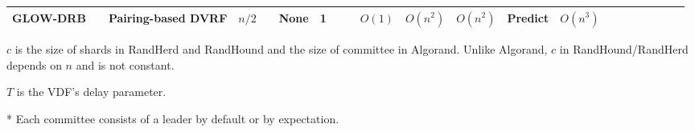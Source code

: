 \documentclass[letterpaper,twocolumn,10pt]{article}
\newcommand{\cmark}{\ding{51}}
\newcommand{\xmark}{\ding{55}}
\theoremstyle{definition}
\theoremstyle{remark}
\begin{document}
\begin{table*}[pt]
\begin{threeparttable}
\begin{tabularx}{\textwidth}{@{} l *{20}c}
GLOW-DRB & & Pairing-based DVRF & $n/2$ & \xmark & None & 1 & \cmark & \cmark & $O(1)$ & $O(n^2)$ & $O(n^2)$ & Predict & $O(n^3)$ \\
\bottomrule
\end{tabularx}
\begin{tablenotes}[flushleft]
\item $c$ is the size of shards in RandHerd and RandHound and the size of committee in Algorand. Unlike Algorand, $c$ in RandHound/RandHerd depends on $n$ and is not constant.
\item $T$ is the VDF's delay parameter.
\item[*] Each committee consists of a leader by default or by expectation.
\end{tablenotes}
\end{threeparttable}
\end{table*}
\end{document}
